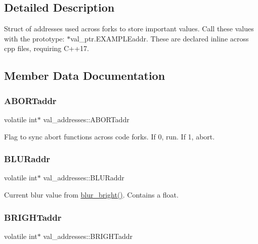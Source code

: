 \subsection{Detailed Description}
Struct of addresses used across forks to store important values. Call these values with the prototype\+: $\ast$val\+\_\+ptr.E\+X\+A\+M\+P\+L\+Eaddr. These are declared inline across cpp files, requiring C++17. 

\subsection{Member Data Documentation}
\mbox{\label{structval__addresses_a0fe118a58a06a6f24181c13f97962e26}} 
\subsubsection{\texorpdfstring{A\+B\+O\+R\+Taddr}{ABORTaddr}}
{\footnotesize\ttfamily volatile int$\ast$ val\+\_\+addresses\+::\+A\+B\+O\+R\+Taddr}

Flag to sync abort functions across code forks. If 0, run. If 1, abort. \mbox{\label{structval__addresses_a09b67aa417beb6f5592192cb7a54de2a}} 
\subsubsection{\texorpdfstring{B\+L\+U\+Raddr}{BLURaddr}}
{\footnotesize\ttfamily volatile int$\ast$ val\+\_\+addresses\+::\+B\+L\+U\+Raddr}

Current blur value from \hyperlink{LunAero_8cpp_a192ed5ab64d56ad402cd4bf562cbf2f5}{blur\+\_\+bright()}. Contains a float. \mbox{\label{structval__addresses_a6eaa61e0b52e12b72dd17ff8bdaa2ac5}} 
\subsubsection{\texorpdfstring{B\+R\+I\+G\+H\+Taddr}{BRIGHTaddr}}
{\footnotesize\ttfamily volatile int$\ast$ val\+\_\+addresses\+::\+B\+R\+I\+G\+H\+Taddr}

